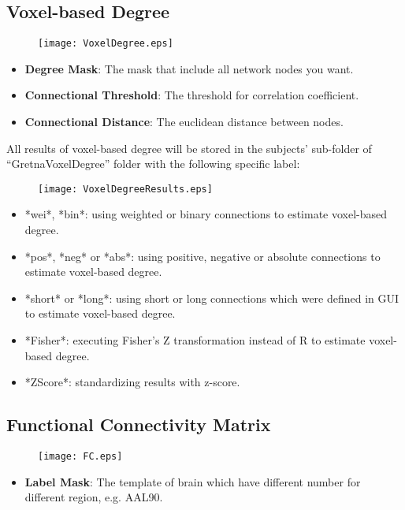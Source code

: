 \documentclass[11pt]{article}
\begin{document}
		\subsection{Voxel-based Degree}
			\begin{figure}
				\begin{center}
					\texttt{[image: VoxelDegree.eps]}
				\end{center}
			\end{figure}
			\begin{itemize}
				\item \textbf{Degree Mask}: The mask that include all network nodes you want.
				\item \textbf{Connectional Threshold}: The threshold for correlation coefficient.
				\item \textbf{Connectional Distance}: The euclidean distance between nodes.
			\end{itemize}
            All results of voxel-based degree will be stored in the
            subjects' sub-folder of ``GretnaVoxelDegree'' 
            folder with the following specific label:
			\begin{figure}
				\begin{center}
					\texttt{[image: VoxelDegreeResults.eps]}
				\end{center}
			\end{figure}
            \begin{itemize}
                \item *wei*, *bin*: using weighted or binary connections to 
                    estimate voxel-based degree.
                \item *pos*, *neg* or *abs*: using positive, negative or
                    absolute connections to estimate voxel-based degree.
                \item *short* or *long*: using short or long connections
                    which were defined in GUI to estimate voxel-based 
                    degree.
                \item *Fisher*: executing Fisher's Z transformation instead
                    of R to estimate voxel-based degree.
                \item *ZScore*: standardizing results with z-score.
            \end{itemize}
		\subsection{Functional Connectivity Matrix}
			\begin{figure}
				\begin{center}
					\texttt{[image: FC.eps]}
				\end{center}
			\end{figure}
			\begin{itemize}
				\item \textbf{Label Mask}: The template of brain which have different number for different region, e.g. AAL90.
			\end{itemize}
\end{document}
